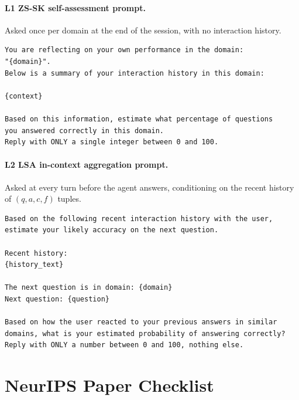 \documentclass[11pt]{article}
\begin{document}
\paragraph{L1 ZS-SK self-assessment prompt.} Asked once per domain at the end of the session, with no interaction history.

\begin{small}
\begin{verbatim}
You are reflecting on your own performance in the domain:
"{domain}".
Below is a summary of your interaction history in this domain:

{context}

Based on this information, estimate what percentage of questions
you answered correctly in this domain.
Reply with ONLY a single integer between 0 and 100.
\end{verbatim}
\end{small}

\paragraph{L2 LSA in-context aggregation prompt.} Asked at every turn before the agent answers, conditioning on the recent history of $(q, a, c, f)$ tuples.

\begin{small}
\begin{verbatim}
Based on the following recent interaction history with the user,
estimate your likely accuracy on the next question.

Recent history:
{history_text}

The next question is in domain: {domain}
Next question: {question}

Based on how the user reacted to your previous answers in similar
domains, what is your estimated probability of answering correctly?
Reply with ONLY a number between 0 and 100, nothing else.
\end{verbatim}
\end{small}



\section*{NeurIPS Paper Checklist}
\end{document}
